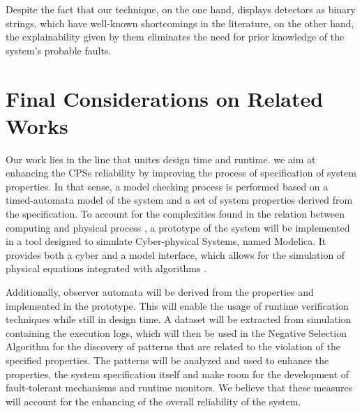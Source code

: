 Despite the fact that our technique, on the one hand, displays detectors as binary strings, which have well-known shortcomings in the literature, on the other hand, the explainability given by them eliminates the need for prior knowledge of the system's probable faults.

\section{Final Considerations on Related Works}

Our work lies in the line that unites design time and runtime. we aim at enhancing the CPSs reliability by improving the process of specification of system properties. In that sense, a model checking process is performed based on a timed-automata model of the system and a set of system properties derived from the specification. To account for the complexities found in the relation between computing and physical process \cite{2014PerceptionsSOTAV&VCPS}, a prototype of the system will be implemented in a tool designed to simulate Cyber-physical Systems, named Modelica. It provides both a cyber and a model interface, which allows for the simulation of physical equations integrated with algorithms \cite{fritzson2011introduction}. 

Additionally, observer automata will be derived from the properties and implemented in the prototype. This will enable the usage of runtime verification techniques while still in design time. A dataset will be extracted from simulation containing the execution logs, which will then be used in the Negative Selection Algorithm \cite{NSAResearch2021} for the discovery of patterns that are related to the violation of the specified properties. The patterns will be analyzed and used to enhance the properties, the system specification itself and make room for the development of fault-tolerant mechanisms and runtime monitors. We believe that these measures will account for the enhancing of the overall reliability of the system.
